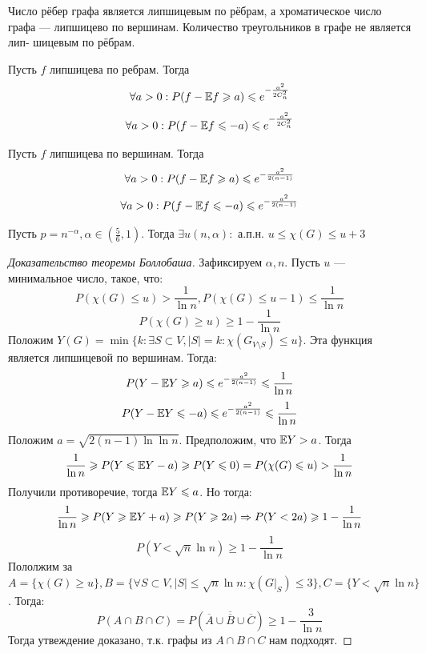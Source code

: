 \begin{example}
    Число рёбер графа является липшицевым по рёбрам, а хроматическое число графа — липшицево по вершинам. Количество треугольников в графе не является лип- шицевым по рёбрам.
\end{example}

\begin{theorem}[б/д]
    Пусть \(f\) липшицева по ребрам. Тогда
    \[\forall a > 0: P(f - \mathbb{E} f \geqslant a) \leqslant e^{-\frac{a^2}{2C_n^2}}\]
    \[\forall a > 0: P(f - \mathbb{E} f \leqslant -a) \leqslant e^{-\frac{a^2}{2C_n^2}}\]

\end{theorem}
\begin{theorem}[б/д]
    Пусть \(f\) липшицева по вершинам. Тогда
    \[\forall a > 0: P(f - \mathbb{E} f \geqslant a) \leqslant e^{-\frac{a^2}{2(n - 1)}}\]
    \[\forall a > 0: P(f - \mathbb{E} f \leqslant -a) \leqslant e^{-\frac{a^2}{2(n - 1)}}\]
\end{theorem}
\begin{theorem}[Боллобаш]
    Пусть \(p = n^{-\alpha}, \alpha \in \left( \frac{5}{6}, 1 \right)\). Тогда \(\exists u(n, \alpha):\) а.п.н. \(u \le \chi(G) \le u + 3\)
\end{theorem}
\begin{proof}[Доказательство теоремы Боллобаша]
    Зафиксируем \(\alpha, n\). Пусть \(u\) --- минимальное число, такое, что:
    \[P(\chi(G) \le u) > \frac{1}{\ln n}, P(\chi(G) \le u - 1) \le \frac{1}{\ln n}\]
    \[P(\chi(G) \ge u) \ge 1 - \frac{1}{\ln n}\]
    Положим \(Y(G) = \min \{k: \exists S \subset V, |S| = k: \chi(G_{V \setminus S}) \le u\}\). Эта функция является липшицевой по вершинам. Тогда:
    \[P(Y - \mathbb{E} Y \geqslant a) \leqslant e^{-\frac{a^2}{2(n - 1)}} \leqslant \frac{1}{\ln n}\]
    \[P(Y - \mathbb{E} Y \leqslant -a) \leqslant e^{-\frac{a^2}{2(n - 1)}} \leqslant \frac{1}{\ln n}\]
    Положим \(a = \sqrt{2(n - 1)\ln\ln n}\). Предположим, что \(\mathbb{E} Y > a\). Тогда
    \[\frac{1}{\ln n} \geqslant P(Y \leqslant \mathbb{E} Y - a) \geqslant P(Y \leqslant 0) = P(\chi(G) \leqslant u) > \frac{1}{\ln n}\]
    Получили противоречие, тогда \(\mathbb{E} Y \leqslant a\). Но тогда:
    \[\frac{1}{\ln n} \geqslant P(Y \geqslant \mathbb{E} Y + a) \geqslant P(Y \geqslant 2a) \Rightarrow P(Y < 2a) \geqslant 1 - \frac{1}{\ln n}\]
    \[P(Y < \sqrt{n}\ln n) \ge 1 - \frac{1}{\ln n}\]
    Пололжим за \(A = \{\chi(G) \ge u\}, B = \{\forall S \subset V, |S| \le \sqrt{n}\ln n: \chi\left( G|_S \right)\le 3\}, C = \{Y < \sqrt{n}\ln n\}\). Тогда:
    \[P(A \cap B \cap C) = P(\overline{\overline{A} \cup \overline{B} \cup \overline{C}}) \ge 1 - \frac{3}{\ln n}\]
    Тогда утвеждение доказано, т.к. графы из \(A \cap B \cap C\) нам подходят.
\end{proof}

